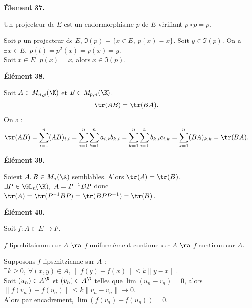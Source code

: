 \documentclass[11pt]{article}
\begin{document}
\vspace*{-0.4cm}

\bf{Élement 37.}

\begin{defi}{}{}
    Un projecteur de $E$ est un endormorphisme $p$ de $E$ vérifiant $p\circ p = p$.
\end{defi}

\vspace*{-0.4cm}

\begin{prop}{}{}
    Soit $p$ un projecteur de $E$, $\Im(p)=\{x\in E, ~ p(x)=x\}$.
    \tcblower
    \boxed{\subset} Soit $y\in\Im(p)$. On a $\exists x\in E, ~ p(t)=p^2(x)=p(x)=y$.\\
    \boxed{\supset} Soit $x\in E, ~ p(x)=x$, alors $x\in\Im(p)$.
\end{prop}

\vspace*{-0.4cm}

\bf{Élément 38.}

\begin{prop}{}{}
    Soit $A\in M_{n,p}(\K)$ et $B\in M_{p,n}(\K)$.
    \begin{equation*}
        \tr(AB)=\tr(BA).
    \end{equation*}
    \tcblower
    On a :
    \begin{equation*}
        \tr(AB)=\sum_{i=1}^n(AB)_{i,i}=\sum_{i=1}^n\sum_{k=1}^na_{i,k}b_{k,i}=\sum_{k=1}^n\sum_{i=1}^nb_{k,i}a_{i,k}=\sum_{k=1}^n(BA)_{k,k}=\tr(BA).
    \end{equation*}
\end{prop}

\bf{Élément 39.}

\begin{prop}{}{}
    Soient $A,B\in M_n(\K)$ semblables. Alors $\tr(A)=\tr(B)$.
    \tcblower
    $\exists P \in \GL_n(\K), ~ A=P^{-1}BP$ donc $\tr(A)=\tr(P^{-1}BP)=\tr(BPP^{-1})=\tr(B)$.
\end{prop}

\bf{Élément 40.}

\begin{prop}{}{}
    Soit $f:A\subset E \to F$.
    \begin{center}
        $f$ lipschitzienne sur $A$ $\ra$ $f$ uniformément continue sur $A$ $\ra$ $f$ continue sur $A$.
    \end{center}
    \tcblower
    Supposons $f$ lipschitzienne sur $A$ : $\exists k \geq 0, ~ \forall (x,y)\in A, ~ \|f(y)-f(x)\|\leq k\|y-x\|$.\\
    Soit $(u_n)\in A^\N$ et $(v_n)\in A^\N$ telles que $\lim(u_n-v_n)=0$, alors $\|f(v_n)-f(u_n)\|\leq k\|v_n - u_n\| \to 0$.\\
    Alors par encadrement, $\lim(f(v_n)-f(u_n))=0$.
\end{prop}
\end{document}
